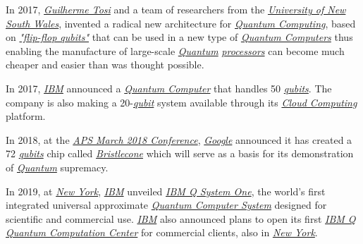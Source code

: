 \documentclass[conference]{IEEEtran}
\begin{document}
\vspace{4pt}

In 2017, \href{https://www.researchgate.net/profile/Guilherme_Tosi}{\textit{Guilherme Tosi}} and a team of researchers from the \href{https://en.wikipedia.org/wiki/University_of_New_South_Wales}{\textit{University of New South Wales}}, invented a radical new architecture for \href{https://en.wikipedia.org/wiki/Quantum_computing}{\textit{Quantum Computing}}, based on \href{https://phys.org/news/2017-09-flip-flop-qubits-radical-quantum.html}{\textit{"flip-flop qubits"}} that can be used in a new type of \href{https://en.wikipedia.org/wiki/Quantum_computing}{\textit{Quantum Computers}} thus enabling the manufacture of large-scale \href{https://en.wikipedia.org/wiki/Quantum}{\textit{Quantum}} \href{https://en.wikipedia.org/wiki/Processor_(computing)}{\textit{processors}} can become much cheaper and easier than was thought possible.

\vspace{4pt}

In 2017, \href{https://en.wikipedia.org/wiki/IBM}{\textit{IBM}} announced a \href{https://en.wikipedia.org/wiki/Quantum_computing}{\textit{Quantum Computer}} that handles 50 \href{https://en.wikipedia.org/wiki/Qubit}{\textit{qubits}}. The company is also making a 20-\href{https://en.wikipedia.org/wiki/Qubit}{\textit{qubit}} system available through its \href{https://en.wikipedia.org/wiki/Cloud_computing}{\textit{Cloud Computing}} platform.

\vspace{4pt}

In 2018, at the \href{https://www.aps.org/meetings/meeting.cfm?name=MAR18}{\textit{APS March 2018 Conference}}, \href{https://en.wikipedia.org/wiki/Google}{\textit{Google}} announced it has created a 72 \href{https://en.wikipedia.org/wiki/Qubit}{\textit{qubits}} chip called \href{https://ai.googleblog.com/2018/03/a-preview-of-bristlecone-googles-new.html}{\textit{Bristlecone}} which will serve as a basis for its demonstration of \href{https://en.wikipedia.org/wiki/Quantum}{\textit{Quantum}} supremacy.

\vspace{4pt}

In 2019, at \href{https://en.wikipedia.org/wiki/New_York_City}{\textit{New York}}, \href{https://en.wikipedia.org/wiki/IBM}{\textit{IBM}} unveiled \href{https://en.wikipedia.org/wiki/IBM_Q_System_One}{\textit{IBM Q System One\texttrademark}}, the world's first integrated universal approximate \href{https://en.wikipedia.org/wiki/Quantum_computing}{\textit{Quantum Computer System}} designed for scientific and commercial use. \href{https://en.wikipedia.org/wiki/IBM}{\textit{IBM}} also announced plans to open its first \href{https://www.research.ibm.com/ibm-q/}{\textit{IBM Q Quantum Computation Center}} for commercial clients, also in \href{https://en.wikipedia.org/wiki/New_York_City}{\textit{New York}}.
\end{document}
